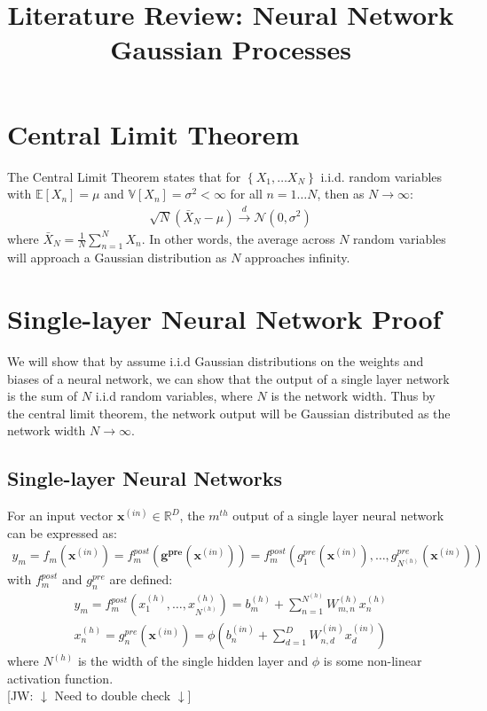 \documentclass[twoside,11pt]{article}
\newcommand{\jw}[1]{{\color{gray} [JW: #1]}}
\begin{document}
\title{Literature Review: Neural Network Gaussian Processes}
\maketitle
\section{Central Limit Theorem}
The Central Limit Theorem states that for $\left\{ X_1, \dots X_N \right\}$ i.i.d. random variables with $\mathbb{E}\left[X_n\right] = \mu$ and $\mathbb{V}\left[X_n\right] = \sigma^2 < \infty$ for all $n=1\dots N$, then as $N \rightarrow \infty$:
\begin{align}
    \sqrt{N}\left(\bar{X}_N-\mu\right) \xrightarrow{d} \mathcal{N}\left(0, \sigma^2\right)
\end{align}
where $\bar{X}_N = \frac{1}{N}\sum_{n=1}^N X_n$. In other words, the average across $N$ random variables will approach a Gaussian distribution as $N$ approaches infinity.
\section{Single-layer Neural Network Proof \cite{lee2018deep}}
We will show that by assume i.i.d Gaussian distributions on the weights and biases of a neural network, we can show that the output of a single layer network is the sum of $N$ i.i.d random variables, where $N$ is the network width. Thus by the central limit theorem, the network output will be Gaussian distributed as the network width $N \rightarrow \infty$.
\subsection{Single-layer Neural Networks}
For an input vector $\mathbf{x}^{(in)} \in \mathbb{R}^D$, the $m^{th}$ output of a single layer neural network can be expressed as:
\begin{align}
    \label{single-layer}
    y_m = f_m\left(\textbf{x}^{(in)}\right) = f_m^{post}\left(\mathbf{g^{pre}}\left(\textbf{x}^{(in)}\right)\right) = f_m^{post}\left(g_1^{pre}\left(\textbf{x}^{(in)}\right), \dots, g_{N^{(h)}}^{pre}\left(\textbf{x}^{(in)}\right)\right)
\end{align}
with $f_m^{post}$ and $g_{n}^{pre}$ are defined:
\begin{align}
    \label{single-layer-out}
    y_m = f_m^{post}\left(x_{1}^{(h)}, \dots, x_{N^{(h)}}^{(h)}\right) = b_m^{(h)} + \sum_{n = 1}^{N^{(h)}} W_{m, n}^{(h)} x_{n}^{(h)} \\
    \label{single-layer-hidden}
    x_{n}^{(h)} = g_{n}^{pre}\left(\mathbf{x}^{(in)}\right) = \phi \left(b_n^{(in)} + \sum_{d=1}^{D} W_{n, d}^{(in)}x_{d}^{(in)}\right)
\end{align}
where $N^{(h)}$ is the width of the single hidden layer and $\phi$ is some non-linear activation function. 
\\\jw{$\downarrow$ Need to double check $\downarrow$}
\end{document}
